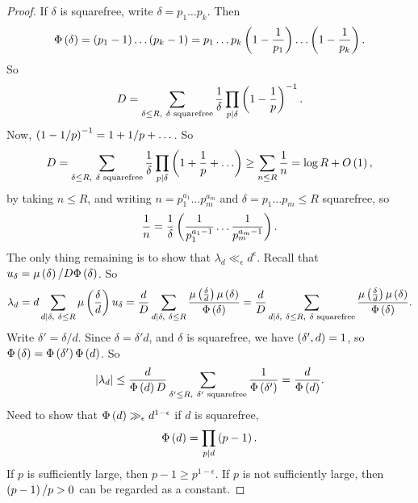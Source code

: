 \begin{proof}
If $ \delta $ is squarefree, write $ \delta = p_1 \dots p_k $. Then
$$ \Phi\left( \delta \right) = \left( p_1 - 1 \right) \dots \left( p_k - 1 \right) = p_1 \dots p_k\left( 1 - \dfrac{1}{p_1} \right) \dots \left( 1 - \dfrac{1}{p_k} \right). $$
So
$$ D = \sum_{\delta \le R, \ \delta \text{ squarefree}} \dfrac{1}{\delta}\prod_{p \mid \delta} \left( 1 - \dfrac{1}{p} \right)^{-1}. $$
Now, $ \left( 1 - 1 / p \right)^{-1} = 1 + 1 / p + \dots $. So
$$ D = \sum_{\delta \le R, \ \delta \text{ squarefree}} \dfrac{1}{\delta}\prod_{p \mid \delta} \rb{1 + \dfrac{1}{p} + \dots} \ge \sum_{n \le R} \dfrac{1}{n} = \log R + O\rb{1}, $$
by taking $ n \le R $, and writing $ n = p_1^{a_1} \dots p_m^{a_m} $ and $ \delta = p_1 \dots p_m \le R $ squarefree, so
$$ \dfrac{1}{n} = \dfrac{1}{\delta}\left( \dfrac{1}{p_1^{a_1 - 1}} \dots \dfrac{1}{p_m^{a_m - 1}} \right). $$
The only thing remaining is to show that $ \lambda_d \ll_\epsilon d^\epsilon $. Recall that $ u_\delta = \mu\left( \delta \right) / D\Phi\left( \delta \right) $. So
$$ \lambda_d = d\sum_{d \mid \delta, \ \delta \le R} \mu\left( \dfrac{\delta}{d} \right)u_\delta = \dfrac{d}{D}\sum_{d \mid \delta, \ \delta \le R} \dfrac{\mu\left( \tfrac{\delta}{d} \right)\mu\left( \delta \right)}{\Phi\left( \delta \right)} = \dfrac{d}{D}\sum_{d \mid \delta, \ \delta \le R, \ \delta \text{ squarefree}} \dfrac{\mu\left( \tfrac{\delta}{d} \right)\mu\left( \delta \right)}{\Phi\left( \delta \right)}. $$
Write $ \delta' = \delta / d $. Since $ \delta = \delta'd $, and $ \delta $ is squarefree, we have $ \left( \delta', d \right) = 1 $, so $ \Phi\left( \delta \right) = \Phi\left( \delta' \right)\Phi\left( d \right) $. So
$$ \left\lvert \lambda_d \right\rvert \le \dfrac{d}{\Phi\left( d \right)D}\sum_{\delta' \le R, \ \delta' \text{ squarefree}} \dfrac{1}{\Phi\left( \delta' \right)} = \dfrac{d}{\Phi\left( d \right)}. $$
Need to show that $ \Phi\left( d \right) \gg_\epsilon d^{1 - \epsilon} $ if $ d $ is squarefree,
$$ \Phi\left( d \right) = \prod_{p \mid d} \left( p - 1 \right). $$
If $ p $ is sufficiently large, then $ p - 1 \ge p^{1 - \epsilon} $. If $ p $ is not sufficiently large, then $ \left( p - 1 \right) / p > 0 $ can be regarded as a constant.
\end{proof}

